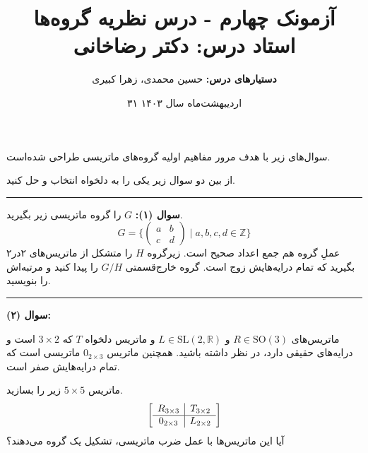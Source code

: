 \documentclass[12pt]{article}
\begin{document}
	
	\title{آزمونک چهارم - درس نظریه‌ گروه‌ها
		\\
	{\normalsize 
	\textbf{استاد درس:}
	دکتر رضاخانی
	}
	}
	\author{
	\small
	\textbf{دستیارهای درس:}
	 حسین محمدی، زهرا کبیری
	} 
\date{۳۱ اردیبهشت‌ماه سال ۱۴۰۳}
	\maketitle
	سوال‌های زیر با هدف مرور مفاهیم اولیه گروه‌های ماتریسی طراحی شده‌است.
	
	از بین دو سوال زیر یکی را به دلخواه انتخاب و حل کنید.

\vspace{0.4em}
\par\noindent\rule{\textwidth}{0.4pt}

\vspace{0.4em}
\noindent
	\textbf{ سوال (۱):}
$G$ را گروه ماتریسی 
زیر بگیرید.
\[
G = \Biggl\{
\begin{pmatrix}
	a&b\\c&d
\end{pmatrix} \; \Big| \; a,b,c,d \in \mathbb{Z}
\Biggr\}
\]
عملِ گروه هم جمع اعداد صحیح است. زیرگروه $H$ را متشکل از ماتریس‌های 
۲در۲ بگیرید که تمام درایه‌هایش زوج است. گروه خارج‌قسمتی 
$G/H$
را پیدا کنید و مرتبه‌اش را بنویسید.
	

	
	
\vspace{0.4em}
	\par\noindent\rule{\textwidth}{0.4pt}
	
		\vspace{0.4em}
		\noindent
	\textbf{ سوال (۲):}
	
	ماتریس‌های 
	$R \in \text{SO}(3)$
	و 
	$L \in \text{SL}(2,\mathbb{R})$
	و ماتریس دلخواه 
	$T$
	که 
	$3\times2$
	است و درایه‌های حقیقی دارد، در نظر داشته باشید.
 همچنین ماتریس 
 $0_{2\times 3}$
 ماتریسی است که تمام درایه‌هایش صفر است.
 
 ماتریس 
 $5 \times 5$
 زیر را بسازید.
 \[
  \left[
 \begin{array}{c|c}
 	R_{\small 3\times 3} & T_{\small 3\times 2}\\
 	\hline
 	0_{\small 2\times 3} & L_{\small 2\times 2}
 \end{array}
 \right]
 \]	
 آیا این ماتریس‌ها با عمل ضرب ماتریسی، تشکیل یک گروه می‌دهند؟
	
	
	
	
	
	
	
	
\end{document}
